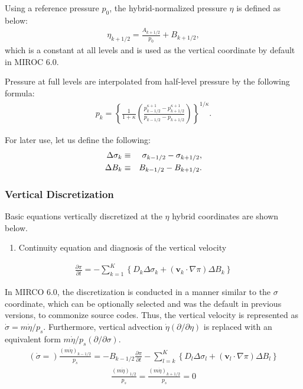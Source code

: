 Using a reference pressure \(p_0\), the hybrid-normalized pressure \(\eta\) is defined as below:
\begin{eqnarray}
\eta_{k+1/2} = \frac{A_{k+1/2}}{p_0} +B_{k+1/2},
\end{eqnarray}
which is a constant at all levels and is used as the vertical coordinate by default in MIROC 6.0.

Pressure at full levels are interpolated from half-level pressure by the following formula:
\begin{eqnarray}
 p_k = \left\{ \frac{1}{1+\kappa}
                     \left( \frac{  p^{\kappa +1}_{k-1/2}
                                  - p^{\kappa +1}_{k+1/2}      }
                                  { p_{k-1/2} - p_{k+1/2} }
                     \right)
              \right\}^{1/\kappa}.
\end{eqnarray}

For later use, let us define the following:
\begin{eqnarray}
  \Delta\sigma_k &\equiv & \sigma_{k-1/2} - \sigma_{k+1/2}, \notag\\
  \Delta B_k &\equiv & B_{k-1/2} - B_{k+1/2}.
\end{eqnarray}

\hypertarget{vertical-discretization-1}{%
\subsubsection{Vertical
Discretization}\label{vertical-discretization-1}}

Basic equations vertically discretized at the $\eta$ hybrid coordinates are shown below.

\begin{enumerate}
\def\labelenumi{\arabic{enumi}.}
\tightlist
\item
  Continuity equation and diagnosis of the vertical velocity
\end{enumerate}
\begin{eqnarray}
  \frac{\partial \pi}{\partial t}
 = - \sum_{k=1}^{K} \left\{ D_k \Delta\sigma_k + ({\mathbf{v}}_k \cdot \nabla \pi)\Delta B_k \right\}
\end{eqnarray}

In MIRCO 6.0, the discretization is conducted in a manner similar to the $\sigma$ coordinate,
which can be optionally selected and was the default in previous versions, to commonize source codes.
Thus, the vertical velocity is represented as \(\dot{\sigma}=m\dot{\eta}/p_s\).
Furthermore, vertical advection \(\dot{\eta}(\partial/\partial\eta)\) is replaced with an equivalent form \(m\dot{\eta}/p_s(\partial/\partial\sigma)\).
\begin{eqnarray}
  \left(\dot{\sigma}=\right)\frac{(m\dot{\eta})_{k-1/2}}{p_s}
 = - B_{k-1/2} \frac{\partial \pi}{\partial t}
   - \sum_{l=k}^{K}\left\{ D_l \Delta\sigma_l + ({\mathbf{v}}_l \cdot \nabla \pi)\Delta B_l \right\}
\end{eqnarray}
\begin{eqnarray}
  \frac{(m\dot{\eta})_{1/2}}{p_s} = \frac{(m\dot{\eta})_{k+1/2}}{p_s} = 0
\end{eqnarray}

